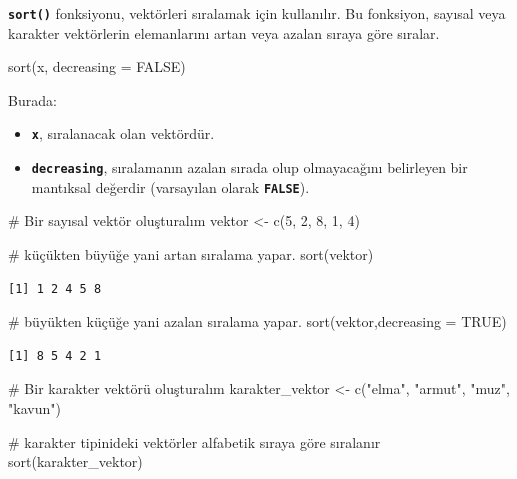 \documentclass[
  letterpaper,
  DIV=11,
  numbers=noendperiod]{scrreprt}
\newenvironment{Shaded}{\begin{snugshade}}{\end{snugshade}}
\newcommand{\AttributeTok}[1]{\textcolor[rgb]{0.40,0.45,0.13}{#1}}
\newcommand{\CommentTok}[1]{\textcolor[rgb]{0.37,0.37,0.37}{#1}}
\newcommand{\ConstantTok}[1]{\textcolor[rgb]{0.56,0.35,0.01}{#1}}
\newcommand{\DecValTok}[1]{\textcolor[rgb]{0.68,0.00,0.00}{#1}}
\newcommand{\FunctionTok}[1]{\textcolor[rgb]{0.28,0.35,0.67}{#1}}
\newcommand{\NormalTok}[1]{\textcolor[rgb]{0.00,0.23,0.31}{#1}}
\newcommand{\OtherTok}[1]{\textcolor[rgb]{0.00,0.23,0.31}{#1}}
\newcommand{\StringTok}[1]{\textcolor[rgb]{0.13,0.47,0.30}{#1}}
\begin{document}
\textbf{\texttt{sort()}} fonksiyonu, vektörleri sıralamak için
kullanılır. Bu fonksiyon, sayısal veya karakter vektörlerin elemanlarını
artan veya azalan sıraya göre sıralar.

\begin{Shaded}
\begin{Highlighting}[]
\FunctionTok{sort}\NormalTok{(x, }\AttributeTok{decreasing =} \ConstantTok{FALSE}\NormalTok{)}
\end{Highlighting}
\end{Shaded}

Burada:

\begin{itemize}
\item
  \textbf{\texttt{x}}, sıralanacak olan vektördür.
\item
  \textbf{\texttt{decreasing}}, sıralamanın azalan sırada olup
  olmayacağını belirleyen bir mantıksal değerdir (varsayılan olarak
  \textbf{\texttt{FALSE}}).
\end{itemize}

\begin{Shaded}
\begin{Highlighting}[]
\CommentTok{\# Bir sayısal vektör oluşturalım}
\NormalTok{vektor }\OtherTok{\textless{}{-}} \FunctionTok{c}\NormalTok{(}\DecValTok{5}\NormalTok{, }\DecValTok{2}\NormalTok{, }\DecValTok{8}\NormalTok{, }\DecValTok{1}\NormalTok{, }\DecValTok{4}\NormalTok{)}

\CommentTok{\# küçükten büyüğe yani artan sıralama yapar.}
\FunctionTok{sort}\NormalTok{(vektor)}
\end{Highlighting}
\end{Shaded}

\begin{verbatim}
[1] 1 2 4 5 8
\end{verbatim}

\begin{Shaded}
\begin{Highlighting}[]
\CommentTok{\# büyükten küçüğe yani azalan sıralama yapar.}
\FunctionTok{sort}\NormalTok{(vektor,}\AttributeTok{decreasing =} \ConstantTok{TRUE}\NormalTok{) }
\end{Highlighting}
\end{Shaded}

\begin{verbatim}
[1] 8 5 4 2 1
\end{verbatim}

\begin{Shaded}
\begin{Highlighting}[]
\CommentTok{\# Bir karakter vektörü oluşturalım}
\NormalTok{karakter\_vektor }\OtherTok{\textless{}{-}} \FunctionTok{c}\NormalTok{(}\StringTok{"elma"}\NormalTok{, }\StringTok{"armut"}\NormalTok{, }\StringTok{"muz"}\NormalTok{, }\StringTok{"kavun"}\NormalTok{)}

\CommentTok{\# karakter tipinideki vektörler alfabetik sıraya göre sıralanır}
\FunctionTok{sort}\NormalTok{(karakter\_vektor)}
\end{Highlighting}
\end{Shaded}
\end{document}
